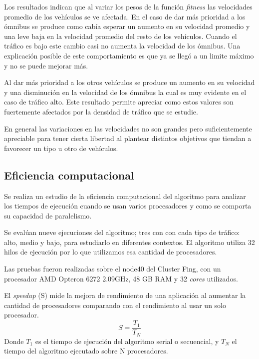 Los resultados indican que al variar los pesos de la función \emph{fitness} las velocidades promedio de los vehículos se ve afectada. En el caso de dar más prioridad a los ómnibus se produce como cabía esperar un aumento en su velocidad promedio y una leve baja en la velocidad promedio del resto de los vehículos. Cuando el tráfico es bajo este cambio casi no aumenta la velocidad de los ómnibus. Una explicación posible de este comportamiento es que ya se llegó a un limite máximo y no se puede mejorar más.

Al dar más prioridad a los otros vehículos se produce un aumento en su velocidad y una disminución en la velocidad de los ómnibus la cual es muy evidente en el caso de tráfico alto. Este resultado permite apreciar como estos valores son fuertemente afectados por la densidad de tráfico que se estudie.

En general las variaciones en las velocidades no son grandes pero suficientemente apreciable para tener cierta libertad al plantear distintos objetivos que tiendan a favorecer un tipo u otro de vehículos.


\subsection{Eficiencia computacional}

Se realiza un estudio de la eficiencia computacional del algoritmo para analizar los tiempos de ejecución cuando se usan varios procesadores y como se comporta su capacidad de paralelismo.

Se evalúan nueve ejecuciones del algoritmo; tres con con cada tipo de tráfico: alto, medio y bajo, para estudiarlo en diferentes contextos. El algoritmo utiliza 32 hilos de ejecución por lo que utilizamos esa cantidad de procesadores.

Las pruebas fueron realizadas sobre el node40 del Cluster Fing, con un procesador AMD Opteron 6272 2.09GHz, 48 GB RAM y 32 \emph{cores} utilizados.

El \emph{speedup} (S) mide la mejora de rendimiento de una aplicación al aumentar la cantidad de procesadores comparando con el rendimiento al usar un solo procesador.
\begin{equation}
\label{eq:funcion_speedup}
S = \frac{T_1}{T_N}
\end{equation}
Donde ${T_1}$ es el tiempo de ejecución del algoritmo serial o secuencial, y ${T_N}$ el tiempo del algoritmo ejecutado sobre N procesadores.
\newline

